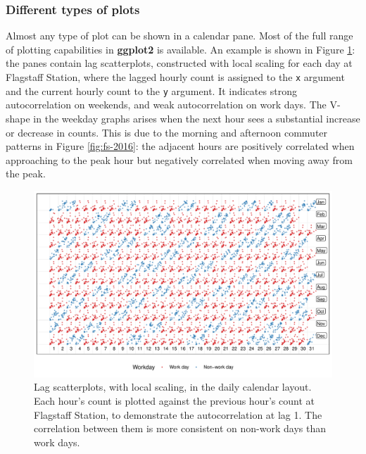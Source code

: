 \documentclass[12pt]{article}
\begin{document}
\hypertarget{different-types-of-plots}{%
\subsubsection{Different types of plots}\label{different-types-of-plots}}

Almost any type of plot can be shown in a calendar pane. Most of the full range of plotting capabilities in \textbf{ggplot2} is available. An example is shown in Figure \ref{fig:scatterplot}: the panes contain lag scatterplots, constructed with local scaling for each day at Flagstaff Station, where the lagged hourly count is assigned to the \texttt{x} argument and the current hourly count to the \texttt{y} argument. It indicates strong autocorrelation on weekends, and weak autocorrelation on work days. The V-shape in the weekday graphs arises when the next hour sees a substantial increase or decrease in counts. This is due to the morning and afternoon commuter patterns in Figure \ref{fig:fs-2016}: the adjacent hours are positively correlated when approaching to the peak hour but negatively correlated when moving away from the peak.

\begin{figure}

{\centering \includegraphics[width=\textwidth]{figure/scatterplot-1} 

}

\caption{Lag scatterplots, with local scaling, in the daily calendar layout. Each hour's count is plotted against the previous hour's count at Flagstaff Station, to demonstrate the autocorrelation at lag 1. The correlation between them is more consistent on non-work days than work days.}\label{fig:scatterplot}
\end{figure}
\end{document}
